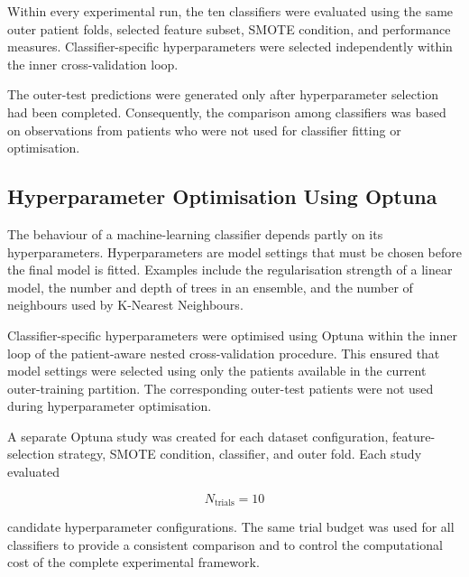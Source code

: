 \documentclass[12pt,twocolumn]{article}
\begin{document}
Within every experimental run, the ten classifiers were evaluated
using the same outer patient folds, selected feature subset, SMOTE
condition, and performance measures. Classifier-specific
hyperparameters were selected independently within the inner
cross-validation loop.

The outer-test predictions were generated only after hyperparameter
selection had been completed. Consequently, the comparison among
classifiers was based on observations from patients who were not used
for classifier fitting or optimisation.




















\subsection{Hyperparameter Optimisation Using Optuna}
\label{subsec:hyperparameter_optimisation}

The behaviour of a machine-learning classifier depends partly on its
hyperparameters. Hyperparameters are model settings that must be chosen
before the final model is fitted. Examples include the regularisation
strength of a linear model, the number and depth of trees in an
ensemble, and the number of neighbours used by K-Nearest Neighbours.

Classifier-specific hyperparameters were optimised using Optuna within
the inner loop of the patient-aware nested cross-validation procedure.
This ensured that model settings were selected using only the patients
available in the current outer-training partition. The corresponding
outer-test patients were not used during hyperparameter optimisation.

A separate Optuna study was created for each dataset configuration,
feature-selection strategy, SMOTE condition, classifier, and outer
fold. Each study evaluated

\begin{equation}
N_{\mathrm{trials}}=10
\label{eq:optuna_trials}
\end{equation}

candidate hyperparameter configurations. The same trial budget was
used for all classifiers to provide a consistent comparison and to
control the computational cost of the complete experimental framework.
\end{document}
